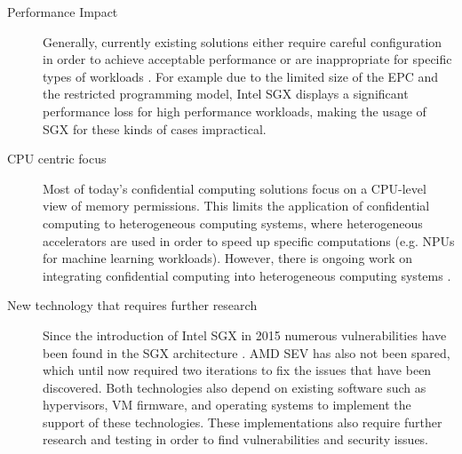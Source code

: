 \begin{description}
  \item[Performance Impact]
    Generally, currently existing solutions either require careful configuration
    in order to achieve acceptable performance or are inappropriate for specific
    types of workloads \cite{akram2021performance}. For example due to the
    limited size of the EPC and the restricted programming model, Intel SGX
    displays a significant performance loss for high performance workloads,
    making the usage of SGX for these kinds of cases impractical.
  \item[CPU centric focus]
    Most of today's confidential computing solutions focus on a CPU-level view
    of memory permissions. This limits the application of confidential computing
    to heterogeneous computing systems, where heterogeneous accelerators are
    used in order to speed up specific computations (e.g. NPUs for machine
    learning workloads). However, there is ongoing work on integrating
    confidential computing into heterogeneous computing systems
    \cite{jiang2022cronus}.
  \item[New technology that requires further research]
    Since the introduction of Intel SGX in 2015 numerous vulnerabilities have
    been found in the SGX architecture \cite{fei2021sgxvulnerabilities}. AMD SEV
    has also not been spared, which until now required two iterations to fix the
    issues that have been discovered. Both technologies also depend on existing
    software such as hypervisors, VM firmware, and operating systems to
    implement the support of these technologies. These implementations also
    require further research and testing in order to find vulnerabilities and
    security issues.
\end{description}

